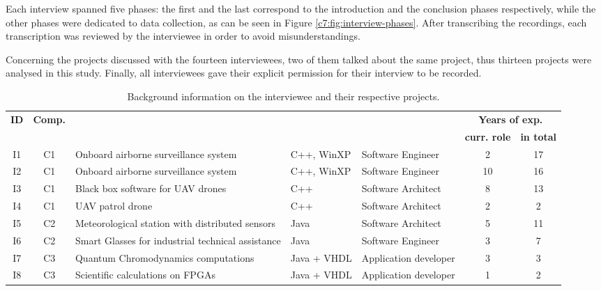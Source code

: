 Each interview spanned five phases: the first and the last correspond to the introduction and the conclusion phases respectively, while the other phases were dedicated to data collection, as can be seen in Figure \ref{c7:fig:interview-phases}.
After transcribing the recordings, each transcription was reviewed by the interviewee in order to avoid misunderstandings.

Concerning the projects discussed with the fourteen interviewees, two of them talked about the same project, thus thirteen projects were analysed in this study.
Finally, all interviewees gave their explicit permission for their interview to be recorded.

\begin{table}[tbp]
   \footnotesize
    \centering
    \caption{Background information on the interviewee and their respective projects.}
    \label{c7:tab:iw-participants-background}
    \begin{tabular}{@{}cc>{\centering\arraybackslash}m{2.5cm}>{\centering\arraybackslash}m{1.5cm}>{\centering\arraybackslash}m{1.5cm}cc@{}}
        \toprule
        \multirow{2}{*}{\bfseries ID} & \multirow{2}{*}{\bfseries Comp.} & \multirow{2}{*}{\bfseries Project} & \multirow{2}{*}{\bfseries Platform} &\multirow{2}{*}{\shortstack{\bfseries Role in \\ \bfseries the comp.}} & \multicolumn{2}{c}{\bfseries Years of exp.} \\
        &  &  &  &  &\multicolumn{1}{c|}{\bfseries curr. role} & \textbf{in total} \\ \midrule
        I1 & C1 & Onboard airborne surveillance system & C++, WinXP  & Software Engineer & 2 & 17 \\
        I2 & C1 & Onboard airborne surveillance system & C++, WinXP  & Software Engineer & 10 & 16 \\
        I3 & C1 & Black box software for UAV drones & C++  & Software Architect & 8 & 13 \\
        I4 & C1 & UAV patrol drone & C++  & Software Architect & 2 & 2\\
        I5 & C2 & Meteorological station with distributed sensors & Java  & Software Architect & 5 & 11 \\
        I6 & C2 & Smart Glasses for industrial technical assistance & Java & Software Engineer & 3 & 7 \\
        I7 & C3 & Quantum Chromodynamics computations & Java + VHDL & Application developer & 3 & 3 \\
        I8 & C3 & Scientific calculations on FPGAs & Java + VHDL & Application developer & 1 & 2 \\

\end{tabular}
\end{table}
